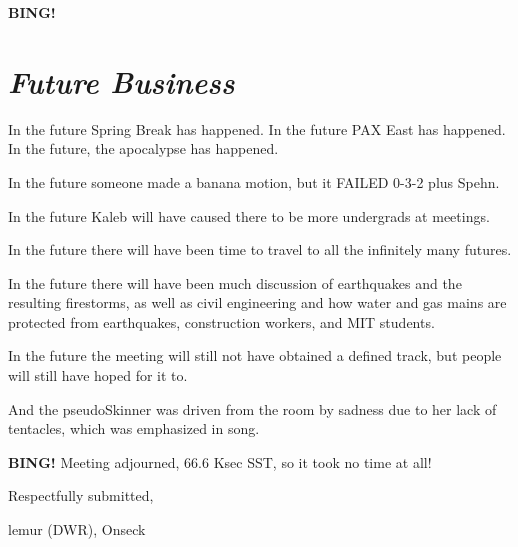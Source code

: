 \documentclass[10pt]{article}
\newcommand{\bing}{{\bf BING!} }
\newcommand{\goto}[1]{\bing \vskip 12pt \section*{{\em{#1}}}}
\newcommand{\ps}{ plus Spehn\xspace}
\newcommand{\onseck}{lemur (DWR), Onseck}
\begin{document}
\goto{Future Business}

In the future Spring Break has happened.  In the future PAX
East has happened.  In the future, the apocalypse has happened.

In the future someone made a banana motion, but it FAILED
0-3-2\ps.

In the future Kaleb will have caused there to be more undergrads
at meetings.

In the future there will have been time to travel to all the
infinitely many futures.

In the future there will have been much discussion of earthquakes
and the resulting firestorms, as well as civil engineering and
how water and gas mains are protected from earthquakes, construction
workers, and MIT students.

In the future the meeting will still not have obtained a defined
track, but people will still have hoped for it to.

And the pseudoSkinner was driven from the room by sadness due to
her lack of tentacles, which was emphasized in song.

\bing
\noindent
Meeting adjourned, 66.6 Ksec SST, so it took no time at all!

\vspace{18pt}

\centerline{Respectfully submitted,}
\centerline{\onseck}
\end{document}
